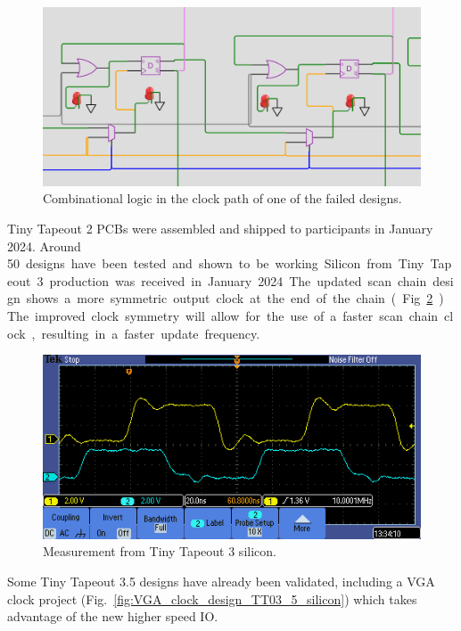 \begin{figure}[!t]
\centering
\includegraphics[width=\columnwidth]{./Figs/wokwi mux clock logic.png}
\caption{Combinational logic in the clock path of one of the failed designs.}
\label{fig:failed_design_comb_logic}
\end{figure}

Tiny Tapeout 2 PCBs were assembled and shipped to participants in January 2024. Around \qty{50} designs have been tested and shown to be working.

Silicon from Tiny Tapeout 3 production was received in January 2024. The updated scan chain design shows a more symmetric output clock at the end of the chain (Fig.~\ref{fig:TT03_silicon_measurement}). The improved clock symmetry will allow for the use of a faster scan chain clock, resulting in a faster update frequency.

\begin{figure}[!t]
\centering
\includegraphics[width=\columnwidth]{./Figs/tt03_clock_out.png}
\caption{Measurement from Tiny Tapeout 3 silicon.}
\label{fig:TT03_silicon_measurement}
\end{figure}

Some Tiny Tapeout 3.5 designs have already been validated, including a VGA clock project (Fig.~\ref{fig:VGA_clock_design_TT03_5_silicon}) which takes advantage of the new higher speed IO.

